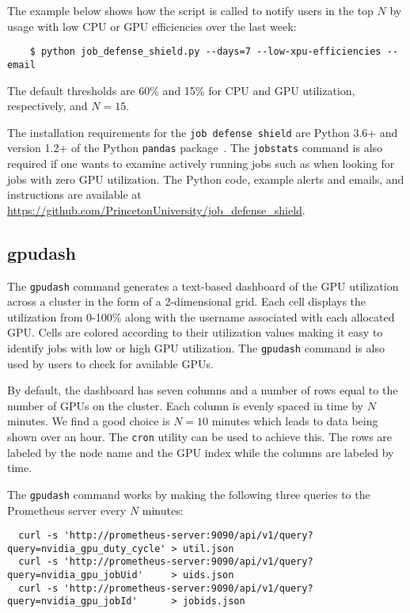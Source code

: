 The example below shows how the script is called to notify users in the top $N$ by usage with low CPU or GPU efficiencies over the last week:

\begin{verbatim}
    $ python job_defense_shield.py --days=7 --low-xpu-efficiencies --email
\end{verbatim}

\noindent
The default thresholds are 60\% and 15\% for CPU and GPU utilization, respectively, and $N=15$.

The installation requirements for the \texttt{job defense shield} are Python 3.6+ and version 1.2+ of the Python \texttt{pandas} package~\cite{reback2020pandas}. The \texttt{jobstats} command is also required if one wants to examine actively running jobs such as when looking for jobs with zero GPU utilization. The Python code, example alerts and emails, and instructions are available at \url{https://github.com/PrincetonUniversity/job_defense_shield}.



\subsection{gpudash}

The \texttt{gpudash} command generates a text-based dashboard of the GPU utilization across a cluster in the form of a 2-dimensional grid. Each cell displays the utilization from 0-100\% along with the username associated with each allocated GPU. Cells are colored according to their utilization values making it easy to identify jobs with low or high GPU utilization. The \texttt{gpudash} command is also used by users to check for available GPUs.

By default, the dashboard has seven columns and a number of rows equal to the number of GPUs on the cluster. Each column is evenly spaced in time by $N$ minutes. We find a good choice is $N=10$ minutes which leads to data being shown over an hour. The \texttt{cron} utility can be used to achieve this. The rows are labeled by the node name and the GPU index while the columns are labeled by time.

The \texttt{gpudash} command works by making the following three queries to the Prometheus server every $N$ minutes:

\begin{verbatim}
  curl -s 'http://prometheus-server:9090/api/v1/query?query=nvidia_gpu_duty_cycle' > util.json
  curl -s 'http://prometheus-server:9090/api/v1/query?query=nvidia_gpu_jobUid'     > uids.json
  curl -s 'http://prometheus-server:9090/api/v1/query?query=nvidia_gpu_jobId'      > jobids.json
\end{verbatim}

